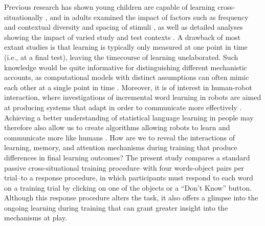 \documentclass[man,floatsintext]{apa6}
\begin{document}
Previous research has shown young children are capable of learning cross-situationally \citep{Suanda:2014}, and in adults examined the impact of factors such as frequency and contextual diversity \citep{Kachergis:2016} and spacing of stimuli \citep{Kachergis:2009tc}, as well as detailed analyses showing the impact of varied study and test contexts \citep{Suanda:2012,Vouloumanos:2008te}. A drawback of most extant studies is that learning is typically only measured at one point in time (i.e., at a final test), leaving the timecourse of learning unelaborated. Such knowledge would be quite informative for distinguishing different mechanistic accounts, as computational models with distinct assumptions can often mimic each other at a single point in time \citep{Yu:2012hyp}. Moreover, it is of interest in human-robot interaction, where investigations of incremental word learning in robots are aimed at producing systems that adapt in order to communicate more effectively \citep{SeabraLopes:2007}. Achieving a better understanding of statistical language learning in people may therefore also allow us to create algorithms allowing robots to learn and communicate more like humans \citep{Lyon:2012}.
How are we to reveal the interactions of learning, memory, and attention mechanisms during training that produce differences in final learning outcomes?
The present study compares a standard passive cross-situational training procedure--with four words-object pairs per trial--to a response procedure, in which participants must respond to each word on a training trial by clicking on one of the objects or a ``Don't Know'' button. Although this response procedure alters the task, it also offers a glimpse into the ongoing learning during training that can grant greater insight into the mechanisms at play.
\end{document}
